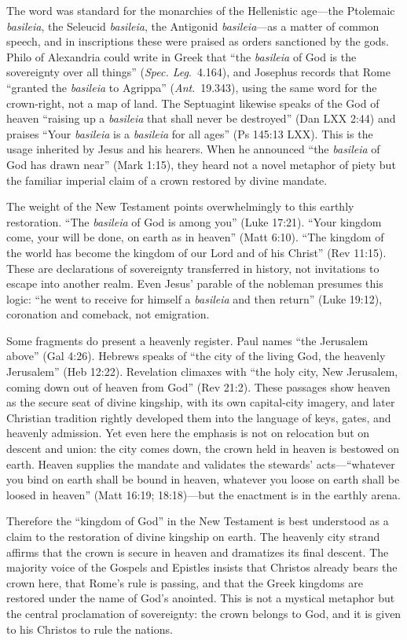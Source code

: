 The word was standard for the monarchies of the Hellenistic age—the Ptolemaic \emph{basileia}, the Seleucid \emph{basileia}, the Antigonid \emph{basileia}—as a matter of common speech, and in inscriptions these were praised as orders sanctioned by the gods.
Philo of Alexandria could write in Greek that “the \emph{basileia} of God is the sovereignty over all things” (\emph{Spec. Leg}.~4.164), and Josephus records that Rome “granted the \emph{basileia} to Agrippa” (\emph{Ant}.~19.343), using the same word for the crown-right, not a map of land.
The Septuagint likewise speaks of the God of heaven “raising up a \emph{basileia} that shall never be destroyed” (Dan LXX 2:44) and praises “Your \emph{basileia} is a \emph{basileia} for all ages” (Ps 145:13 LXX).
This is the usage inherited by Jesus and his hearers.
When he announced “the \emph{basileia} of God has drawn near” (Mark 1:15), they heard not a novel metaphor of piety but the familiar imperial claim of a crown restored by divine mandate.

The weight of the New Testament points overwhelmingly to this earthly restoration.
“The \emph{basileia} of God is among you” (Luke 17:21).
“Your kingdom come, your will be done, on earth as in heaven” (Matt 6:10).
“The kingdom of the world has become the kingdom of our Lord and of his Christ” (Rev 11:15).
These are declarations of sovereignty transferred in history, not invitations to escape into another realm.
Even Jesus’ parable of the nobleman presumes this logic: “he went to receive for himself a \emph{basileia} and then return” (Luke 19:12), coronation and comeback, not emigration.

Some fragments do present a heavenly register.
Paul names “the Jerusalem above” (Gal 4:26).
Hebrews speaks of “the city of the living God, the heavenly Jerusalem” (Heb 12:22).
Revelation climaxes with “the holy city, New Jerusalem, coming down out of heaven from God” (Rev 21:2).
These passages show heaven as the secure seat of divine kingship, with its own capital-city imagery, and later Christian tradition rightly developed them into the language of keys, gates, and heavenly admission.
Yet even here the emphasis is not on relocation but on descent and union: the city comes down, the crown held in heaven is bestowed on earth.
Heaven supplies the mandate and validates the stewards’ acts—“whatever you bind on earth shall be bound in heaven, whatever you loose on earth shall be loosed in heaven” (Matt 16:19; 18:18)—but the enactment is in the earthly arena.

Therefore the “kingdom of God” in the New Testament is best understood as a claim to the restoration of divine kingship on earth.
The heavenly city strand affirms that the crown is secure in heaven and dramatizes its final descent.
The majority voice of the Gospels and Epistles insists that Christos already bears the crown here, that Rome’s rule is passing, and that the Greek kingdoms are restored under the name of God’s anointed.
This is not a mystical metaphor but the central proclamation of sovereignty: the crown belongs to God, and it is given to his Christos to rule the nations.

